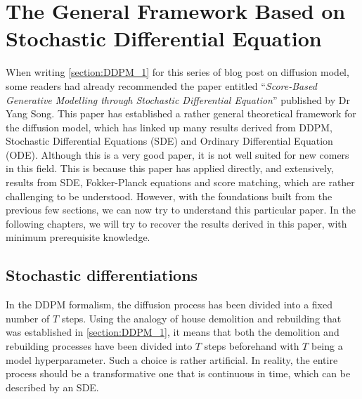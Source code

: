 \section{The General Framework Based on Stochastic Differential Equation}
\label{sect_5:SDE}

When writing \cref{section:DDPM_1} for this series of blog post on diffusion model, some readers had already recommended the paper entitled ``\emph{Score-Based Generative Modelling through Stochastic Differential Equation}''\cite{song2020score} published by Dr Yang Song. This paper has established a rather general theoretical framework for the diffusion model, which has linked up many results derived from DDPM, Stochastic Differential Equations (SDE) and Ordinary Differential Equation (ODE). Although this is a very good paper, it is not well suited for new comers in this field. This is because this paper has applied directly, and extensively, results from SDE, Fokker-Planck equations and score matching, which are rather challenging to be understood. However, with the foundations built from the previous few sections, we can now try to understand this particular paper. In the following chapters, we will try to recover the results derived in this paper, with minimum prerequisite knowledge.

\subsection{Stochastic differentiations}\marginnote{\footnotesize{
\textcolor{red}{This subsection discuss how the diffusion model, that was established in the discrete time domain, can be generalised into the continuous time domain.}
}}

In the DDPM formalism, the diffusion process has been divided into a fixed number of $T$ steps. Using the analogy of house demolition and rebuilding that was established in \cref{section:DDPM_1}, it means that both the demolition and rebuilding processes have been divided into $T$ steps beforehand with $T$ being a model hyperparameter. Such a choice is rather artificial. In reality, the entire process should be a transformative one that is continuous in time, which can be described by an SDE.

